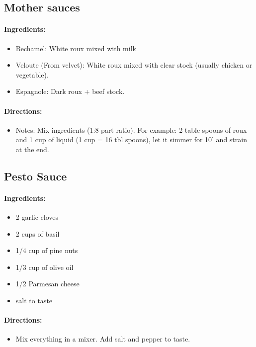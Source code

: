 \documentclass{article}
\begin{document}
\subsection{Mother sauces}

\paragraph{Ingredients:}
\begin{itemize}
	\item Bechamel: White roux mixed with milk
	\item Veloute (From velvet): White roux mixed with clear stock (usually chicken or vegetable).
	\item Espagnole: Dark roux + beef stock.
\end{itemize}

\paragraph{Directions:}
\begin{itemize}
	\item Notes: Mix ingredients (1:8 part ratio). For example: 2 table spoons of roux and 1 cup of liquid (1 cup = 16 tbl spoons), let it simmer for 10' and strain at the end.
\end{itemize}


\subsection{Pesto Sauce}

\paragraph{Ingredients:}

\begin{itemize}
	\item 2 garlic cloves
	\item 2 cups of basil
	\item 1/4 cup of pine nuts
	\item 1/3 cup of olive oil
	\item 1/2 Parmesan cheese
	\item salt to taste
\end{itemize}

\paragraph{Directions:}
\begin{itemize}
	\item Mix everything in a mixer. Add salt and pepper to taste.
\end{itemize}
\end{document}
